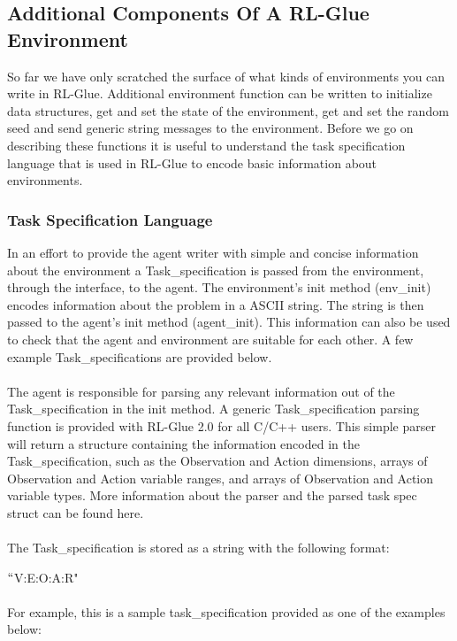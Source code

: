\documentclass[11pt]{article}
\begin{document}
\subsection{Additional Components Of A RL-Glue Environment}

So far we have only scratched the surface of what kinds of environments you can write in RL-Glue. Additional environment function can be written to initialize data structures, get and set the state of the environment, get and set the random seed and send generic string messages to the environment. Before we go on describing these functions it is useful to understand the task specification language that is used in RL-Glue to encode basic information about environments. 

\subsubsection{Task Specification Language}
In an effort to provide the agent writer with simple and concise information about the environment a Task\_specification is passed from the environment, through the interface, to the agent. The environment's init method (env\_init) encodes information about the problem in a ASCII string. The string is then passed to the agent's init method (agent\_init).  This information can also be used to check that the agent and environment are suitable for each other. A few example Task\_specifications are provided below.
\\\\
The agent is responsible for parsing any relevant information out of the Task\_specification in the init method. A generic Task\_specification parsing function is provided with RL-Glue 2.0 for all C/C++ users. This simple parser will return a structure containing the information encoded in the Task\_specification, such as the Observation and Action dimensions, arrays of Observation and Action variable ranges, and arrays of Observation and Action variable types. More information about the parser and the parsed task spec struct can be found here.
\\\\
The Task\_specification is stored as a string with the following format:

\hspace{30 pt} $``$V:E:O:A:R"\\\\
For example, this is a sample task\_specification provided as one of the examples below:
\end{document}
